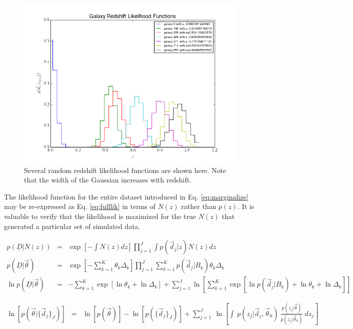 \documentclass[12pt, onecolumn]{emulateapj}
\newcommand{\textul}{\underline}
\begin{document}
\begin{figure}
\label{fig:pzs}
\includegraphics[scale=0.5]{lik-samps.png}
\caption{Several random redshift likelihood functions are shown here.  Note that the width of the Gaussian increases with redshift.}
\end{figure}

The likelihood function for the entire dataset introduced in Eq. \ref{eq:marginalize} may be re-expressed as Eq. \ref{eq:fulllik} in terms of $N(z)$ rather than $p(z)$.  It is valuable to verify that the likelihood is maximized for the true $N(z)$ that generated a particular set of simulated data.

\begin{eqnarray}
\label{eq:fulllik}
p(\textul{D}|N(z)) &=& \exp\left[-\int N(z)dz\right] \prod_{j=1}^{J}\int p(\vec{d}_{j}|z)N(z)dz\\
p(\textul{D}|\vec{\theta}) &=& \exp\left[-\sum_{k=1}^{K}\theta_{k}\Delta_{k}\right] \prod_{j=1}^{J}\sum_{k=1}^{K} p(\vec{d}_{j}|B_{k})\theta_{k}\Delta_{k} \nonumber\\
\ln p(\textul{D}|\vec{\theta}) &=& -\sum_{k=1}^{K}\exp\left[\ln\theta_{k}+\ln\Delta_{k}\right]+\sum_{j=1}^{J}\ln\left[\sum_{k=1}^{K}\exp\left[\ln p(\vec{d}_{j}|B_{k})+\ln\theta_{k}+\ln\Delta_{k}\right]\right] \nonumber
\end{eqnarray}

\begin{eqnarray}
\label{eq:logpost}
\ln[p(\vec{\theta}|\{\vec{d}_{j}\}_{J})] &=& \ln[p(\vec{\theta})] - \ln[p(\{\vec{d}_{j}\}_{J})] + \sum_{j=1}^{J}\ \ln\left[\int\ p(z_{j}|\vec{d}_{j},\vec{\theta}_{0})\ \frac{p(z_{j}|\vec{\theta})}{p(z_{j}|\vec{\theta}_{0})}\ dz_{j}\right]
\end{eqnarray}
\end{document}
